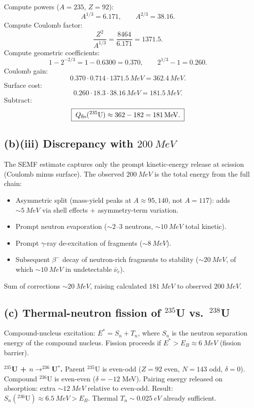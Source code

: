 \documentclass[11pt]{article}
\begin{document}
Compute powers ($A=235$, $Z=92$):
\[
A^{1/3}=6.171,\qquad A^{2/3}=38.16.
\]
Compute Coulomb factor:
\[
\frac{Z^{2}}{A^{1/3}}=\frac{8464}{6.171}=1371.5.
\]
Compute geometric coefficients:
\[
1-2^{-2/3}=1-0.6300=0.370,\qquad 2^{1/3}-1=0.260.
\]
Coulomb gain:
\[
0.370\cdot 0.714\cdot 1371.5\,\si{MeV}=362.4\,\si{MeV}.
\]
Surface cost:
\[
0.260\cdot 18.3\cdot 38.16\,\si{MeV}=181.5\,\si{MeV}.
\]
Subtract:
\begin{equation}
\boxed{\;Q_{\rm fis}(^{235}\mathrm{U})\approx 362-182=\SI{181}{MeV}.\;}
\label{eq:Qfis-num}
\end{equation}

\subsection*{(b)(iii) Discrepancy with $\SI{200}{MeV}$}

The SEMF estimate captures only the prompt kinetic-energy release at scission (Coulomb minus surface). The observed $\SI{200}{MeV}$ is the total energy from the full chain:
\begin{itemize}
\item Asymmetric split (mass-yield peaks at $A\approx 95,140$, not $A=117$): adds $\sim\SI{5}{MeV}$ via shell effects + asymmetry-term variation.
\item Prompt neutron evaporation ($\sim 2$--$3$ neutrons, $\sim\SI{10}{MeV}$ total kinetic).
\item Prompt $\gamma$-ray de-excitation of fragments ($\sim\SI{8}{MeV}$).
\item Subsequent $\beta^{-}$ decay of neutron-rich fragments to stability ($\sim\SI{20}{MeV}$, of which $\sim\SI{10}{MeV}$ in undetectable $\bar\nu_e$).
\end{itemize}
Sum of corrections $\sim\SI{20}{MeV}$, raising calculated $\SI{181}{MeV}$ to observed $\SI{200}{MeV}$.

\subsection*{(c) Thermal-neutron fission of $^{235}$U vs.\ $^{238}$U}

Compound-nucleus excitation: $E^{*}=S_n+T_n$, where $S_n$ is the neutron separation energy of the compound nucleus. Fission proceeds if $E^{*}>E_B\approx \SI{6}{MeV}$ (fission barrier).

\textbf{$^{235}$U + $n\to ^{236}$U$^{*}$.} Parent $^{235}$U is even-odd ($Z=92$ even, $N=143$ odd, $\delta=0$). Compound $^{236}$U is even-even ($\delta=-12$ MeV). Pairing energy released on absorption: extra $\sim\SI{12}{MeV}$ relative to even-odd. Result: $S_n(^{236}\mathrm{U})\approx \SI{6.5}{MeV}>E_B$. Thermal $T_n\sim\SI{0.025}{eV}$ already sufficient.
\end{document}
